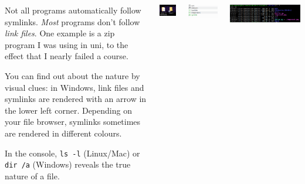 \begin{frame}
%
\begin{columns}
\begin{hintbox}
	\footnotesize
	Not all programs automatically follow symlinks. \emph{Most} programs don't follow \emph{link files}. One example is a zip program I was using in uni, to the effect
	that I nearly failed a course.
	
	\vspace{3pt}
	You can find out about the nature by visual clues: in Windows, link files and symlinks are rendered with an arrow in the lower left corner.
	Depending on your file browser, symlinks sometimes are rendered in different colours.
	
	\vspace{3pt}
	In the console, \texttt{ls -l} (Linux/Mac) or \texttt{dir /a} (Windows) reveals the true nature of a file.
\end{hintbox}
%
	\begin{center}
		\includegraphics[width=.4\linewidth]{./gfx/14-link-folder}
	\end{center}
	
	\begin{center}
		\includegraphics[width=.8\linewidth]{./gfx/14-link-linux}
	\end{center}
	
	\begin{center}
		\includegraphics[width=1.\linewidth]{./gfx/14-link-terminal}
	\end{center}
	
	
\end{columns}
%
\end{frame}

